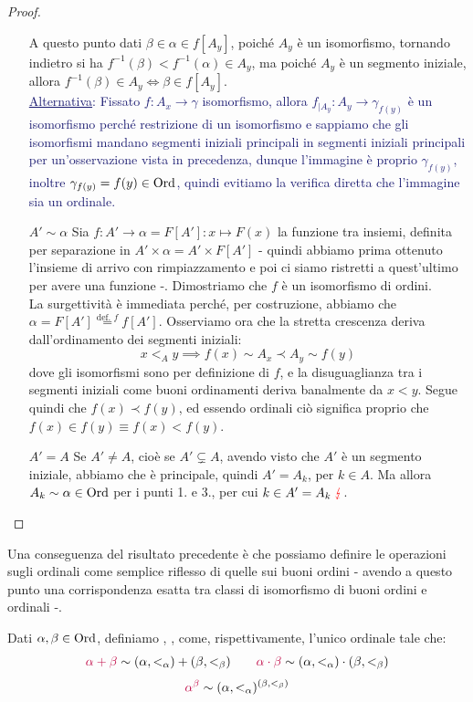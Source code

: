 \begin{proof}
\begin{itemize}
		A questo punto dati $\beta \in \alpha \in f[A_y]$, poiché $A_y$ è un isomorfismo, tornando indietro si ha $f^{-1}(\beta) < f^{-1}(\alpha) \in A_y$, ma poiché $A_y$ è un segmento iniziale, allora $f^{-1}(\beta) \in A_y \iff \beta \in f[A_y]$.\\
		\textcolor{MidnightBlue}{\underline{Alternativa}: Fissato $f : A_x \to \gamma$ isomorfismo, allora $f_{|A_y} : A_y \to \gamma_{f(y)}$ è un isomorfismo perché restrizione di un isomorfismo e sappiamo che gli isomorfismi mandano segmenti iniziali principali in segmenti iniziali principali per un'osservazione vista in precedenza, dunque l'immagine è proprio $\gamma_{f(y)}$, inoltre
		$\gamma_{f(y)} = f(y) \in \operatorname{Ord}$, quindi evitiamo la verifica diretta che l'immagine sia un ordinale.}
		\item[$\boxed{A' \sim \alpha}$] Sia $f : A' \rightarrow \alpha = F[A'] : x \mapsto F(x)$ la funzione tra insiemi, definita per separazione in $A' \times \alpha = A' \times F[A']$ - quindi abbiamo prima ottenuto l'insieme di arrivo con rimpiazzamento e poi ci siamo ristretti a quest'ultimo per avere una funzione -. Dimostriamo che $f$ è un isomorfismo di ordini.\\
		La surgettività è immediata perché, per costruzione, abbiamo che $\alpha = F[A'] \overset{\text{def. $f$}}{=} f[A']$. Osserviamo ora che la stretta crescenza deriva dall'ordinamento dei segmenti iniziali:
		\[ x <_A y \implies f(x) \sim A_x \prec A_y \sim f(y)
			\]
		dove gli isomorfismi sono per definizione di $f$, e la disuguaglianza tra i segmenti iniziali come buoni ordinamenti deriva banalmente da $x < y$. Segue quindi che $f(x) \prec f(y)$, ed essendo ordinali ciò significa proprio che $f(x) \in f(y) \equiv f(x) < f(y)$.
		\item[$\boxed{A' = A}$] Se $A' \ne A$, cioè se $A' \subsetneq A$, avendo visto che $A'$ è un segmento iniziale, abbiamo che è principale, quindi $A' = A_k$, per $k \in A$.		Ma allora $A_k \sim \alpha \in \operatorname{Ord}$ per i punti 1. e 3., per cui $k \in A' = A_k \;\textcolor{red}\lightning$.
	\end{itemize}
\end{proof}

Una conseguenza del risultato precedente è che possiamo definire le operazioni sugli ordinali come semplice riflesso di quelle sui buoni ordini - avendo a questo punto una corrispondenza esatta tra classi di isomorfismo di buoni ordini e ordinali -.

\begin{definition}
	Dati $\alpha,\beta \in\operatorname{Ord}$, definiamo \vocab{$\alpha + \beta$}, \vocab{$\alpha\cdot\beta$}, \vocab{$\alpha^\beta$} come, rispettivamente, l'unico ordinale tale che:
	\[ \textcolor{purple}{\alpha + \beta} \sim (\alpha,<_\alpha)+(\beta,<_\beta) \qquad \textcolor{purple}{\alpha \cdot \beta} \sim (\alpha,<_\alpha) \cdot (\beta,<_\beta)
		\]\[ \textcolor{purple}{\alpha^\beta} \sim (\alpha,<_\alpha)^{(\beta,<_\beta)}
			\]
\end{definition}

